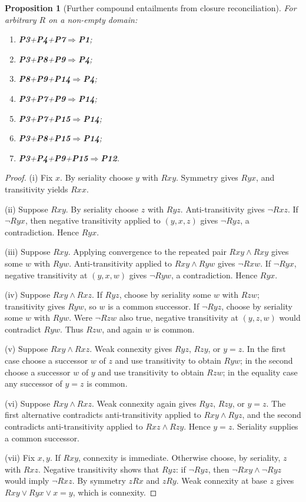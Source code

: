 \documentclass[11pt,a4paper,reqno]{amsart}
\newtheorem{proposition}{Proposition}[section]
\theoremstyle{definition}
\theoremstyle{remark}
\newcommand{\prop}[1]{\textbf{P#1}}
\newcommand{\catentails}{\Rightarrow}
\begin{document}
\begin{proposition}[Further compound entailments from closure reconciliation]
\label{prop:closure-entailments}
For arbitrary $R$ on a non-empty domain:
\begin{enumerate}[label=(\roman*),noitemsep]
\item \prop{3}+\prop{4}+\prop{7}$\catentails$\prop{1};
\item \prop{3}+\prop{8}+\prop{9}$\catentails$\prop{4};
\item \prop{8}+\prop{9}+\prop{14}$\catentails$\prop{4};
\item \prop{3}+\prop{7}+\prop{9}$\catentails$\prop{14};
\item \prop{3}+\prop{7}+\prop{15}$\catentails$\prop{14};
\item \prop{3}+\prop{8}+\prop{15}$\catentails$\prop{14};
\item \prop{3}+\prop{4}+\prop{9}+\prop{15}$\catentails$\prop{12}.
\end{enumerate}
\end{proposition}
\begin{proof}
(i) Fix $x$.  By seriality choose $y$ with $Rxy$.  Symmetry gives $Ryx$, and
transitivity yields $Rxx$.

(ii) Suppose $Rxy$.  By seriality choose $z$ with $Ryz$.  Anti-transitivity
gives $\neg Rxz$.  If $\neg Ryx$, then negative transitivity applied to
$(y,x,z)$ gives $\neg Ryz$, a contradiction.  Hence $Ryx$.

(iii) Suppose $Rxy$.  Applying convergence to the repeated pair
$Rxy\wedge Rxy$ gives some $w$ with $Ryw$.  Anti-transitivity applied to
$Rxy\wedge Ryw$ gives $\neg Rxw$.  If $\neg Ryx$, negative transitivity at
$(y,x,w)$ gives $\neg Ryw$, a contradiction.  Hence $Ryx$.

(iv) Suppose $Rxy\wedge Rxz$.  If $Ryz$, choose by seriality some $w$ with
$Rzw$; transitivity gives $Ryw$, so $w$ is a common successor.  If
$\neg Ryz$, choose by seriality some $w$ with $Ryw$.  Were $\neg Rzw$ also
true, negative transitivity at $(y,z,w)$ would contradict $Ryw$.  Thus $Rzw$,
and again $w$ is common.

(v) Suppose $Rxy\wedge Rxz$.  Weak connexity gives $Ryz$, $Rzy$, or $y=z$.
In the first case choose a successor $w$ of $z$ and use transitivity to obtain
$Ryw$; in the second choose a successor $w$ of $y$ and use transitivity to
obtain $Rzw$; in the equality case any successor of $y=z$ is common.

(vi) Suppose $Rxy\wedge Rxz$.  Weak connexity again gives $Ryz$, $Rzy$, or
$y=z$.  The first alternative contradicts anti-transitivity applied to
$Rxy\wedge Ryz$, and the second contradicts anti-transitivity applied to
$Rxz\wedge Rzy$.  Hence $y=z$.  Seriality supplies a common successor.

(vii) Fix $x,y$.  If $Rxy$, connexity is immediate.  Otherwise choose, by
seriality, $z$ with $Rxz$.  Negative transitivity shows that $Ryz$: if
$\neg Ryz$, then $\neg Rxy\wedge\neg Ryz$ would imply $\neg Rxz$.
By symmetry $zRx$ and $zRy$.  Weak connexity at base $z$ gives
$Rxy\vee Ryx\vee x=y$, which is connexity.
\end{proof}
\end{document}
